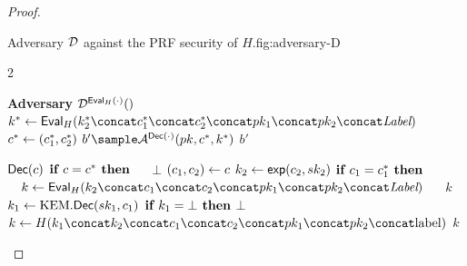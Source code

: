 \begin{proof}
\begin{itemize}
\begin{gamefigure}{Adversary $\mathcal{D}$ against the PRF security of $H$.}{fig:adversary-D}
\begin{games}{2}
\begin{gameenv}{\textbf{Adversary} $\mathcal{D}^{\textsf{Eval}_H(\cdot)}()$}
                    \State $k^* \assign \Eval_{H}(k^*_2 \concat c^*_1 \concat c^*_2 \concat \pk_1 \concat \pk_2 \concat \lbl)$
                    \State $c^* \leftarrow (c_1^*, c_2^*)$
                    \State $b' \sample \adversary{A}^{\dec(\cdot)}(\pk, c^*, k^*)$
                    \State \Return $b'$
                \end{gameenv}
                \gamebreak
                \begin{gameenv}{\oracle $\textsf{Dec}(c)$}
                    \State $\textbf{if } c = c^* \textbf{ then}$
                    \State $\quad$ \Return $\bot$
                    \State $(c_1, c_2) \leftarrow c$
                    \State $k_2 \leftarrow \textsf{exp}(c_2, sk_2)$
                    \State $\textbf{if } c_1 = c^*_1 \textbf{ then}$
                    \State $\quad k \assign \Eval_{H}(k_2 \concat c_1 \concat c_2 \concat\pk_1 \concat \pk_2 \concat \lbl)$
                    \State $\quad$ \Return $k$
                    \State $k_1 \leftarrow \text{KEM}.\textsf{Dec}(sk_1,c_1)$
                    \State $\textbf{if } k_1 = \bot \textbf{ then}$
                    \State \quad \Return $\bot$
                    \State $k \assign H(\hashinput)$
                    \State \Return $k$
                \end{gameenv}
            \end{games}
        \end{gamefigure}

    \end{itemize}


\end{proof}
